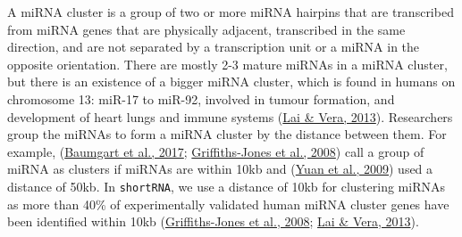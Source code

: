 \documentclass[12pt,twoside]{reedthesis}
\begin{document}
A miRNA cluster is a group of two or more miRNA hairpins that are
transcribed from miRNA genes that are physically adjacent, transcribed
in the same direction, and are not separated by a transcription unit or
a miRNA in the opposite orientation. There are mostly 2-3 mature miRNAs
in a miRNA cluster, but there is an existence of a bigger miRNA cluster,
which is found in humans on chromosome 13: miR-17 to miR-92, involved in
tumour formation, and development of heart lungs and immune systems
(\protect\hyperlink{ref-lai2013}{Lai \& Vera, 2013}). Researchers group the miRNAs to form a miRNA cluster by the
distance between them. For example, (\protect\hyperlink{ref-baumgart2017}{Baumgart et al., 2017}; \protect\hyperlink{ref-griffiths-jones2008}{Griffiths-Jones et al., 2008}) call a group of miRNA as clusters if miRNAs are within
10kb and (\protect\hyperlink{ref-yuan2009}{Yuan et al., 2009}) used a distance of 50kb. In \texttt{shortRNA}, we use a
distance of 10kb for clustering miRNAs as more than 40\% of
experimentally validated human miRNA cluster genes have been identified
within 10kb (\protect\hyperlink{ref-griffiths-jones2008}{Griffiths-Jones et al., 2008}; \protect\hyperlink{ref-lai2013}{Lai \& Vera, 2013}).
\end{document}

